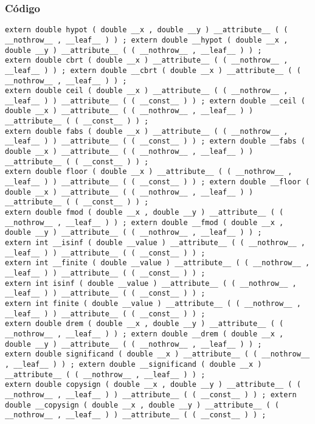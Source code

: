 \documentclass{beamer}
\begin{document}
\begin{frame}[fragile]
\frametitle{C\'odigo}
\begin{verbatim}
extern double hypot ( double __x , double __y ) __attribute__ ( ( __nothrow__ , __leaf__ ) ) ; extern double __hypot ( double __x , double __y ) __attribute__ ( ( __nothrow__ , __leaf__ ) ) ; 
extern double cbrt ( double __x ) __attribute__ ( ( __nothrow__ , __leaf__ ) ) ; extern double __cbrt ( double __x ) __attribute__ ( ( __nothrow__ , __leaf__ ) ) ; 
extern double ceil ( double __x ) __attribute__ ( ( __nothrow__ , __leaf__ ) ) __attribute__ ( ( __const__ ) ) ; extern double __ceil ( double __x ) __attribute__ ( ( __nothrow__ , __leaf__ ) ) __attribute__ ( ( __const__ ) ) ; 
extern double fabs ( double __x ) __attribute__ ( ( __nothrow__ , __leaf__ ) ) __attribute__ ( ( __const__ ) ) ; extern double __fabs ( double __x ) __attribute__ ( ( __nothrow__ , __leaf__ ) ) __attribute__ ( ( __const__ ) ) ; 
extern double floor ( double __x ) __attribute__ ( ( __nothrow__ , __leaf__ ) ) __attribute__ ( ( __const__ ) ) ; extern double __floor ( double __x ) __attribute__ ( ( __nothrow__ , __leaf__ ) ) __attribute__ ( ( __const__ ) ) ; 
extern double fmod ( double __x , double __y ) __attribute__ ( ( __nothrow__ , __leaf__ ) ) ; extern double __fmod ( double __x , double __y ) __attribute__ ( ( __nothrow__ , __leaf__ ) ) ; 
extern int __isinf ( double __value ) __attribute__ ( ( __nothrow__ , __leaf__ ) ) __attribute__ ( ( __const__ ) ) ; 
extern int __finite ( double __value ) __attribute__ ( ( __nothrow__ , __leaf__ ) ) __attribute__ ( ( __const__ ) ) ; 
extern int isinf ( double __value ) __attribute__ ( ( __nothrow__ , __leaf__ ) ) __attribute__ ( ( __const__ ) ) ; 
extern int finite ( double __value ) __attribute__ ( ( __nothrow__ , __leaf__ ) ) __attribute__ ( ( __const__ ) ) ; 
extern double drem ( double __x , double __y ) __attribute__ ( ( __nothrow__ , __leaf__ ) ) ; extern double __drem ( double __x , double __y ) __attribute__ ( ( __nothrow__ , __leaf__ ) ) ; 
extern double significand ( double __x ) __attribute__ ( ( __nothrow__ , __leaf__ ) ) ; extern double __significand ( double __x ) __attribute__ ( ( __nothrow__ , __leaf__ ) ) ; 
extern double copysign ( double __x , double __y ) __attribute__ ( ( __nothrow__ , __leaf__ ) ) __attribute__ ( ( __const__ ) ) ; extern double __copysign ( double __x , double __y ) __attribute__ ( ( __nothrow__ , __leaf__ ) ) __attribute__ ( ( __const__ ) ) ; 
\end{verbatim}
\end{frame}
\end{document}
